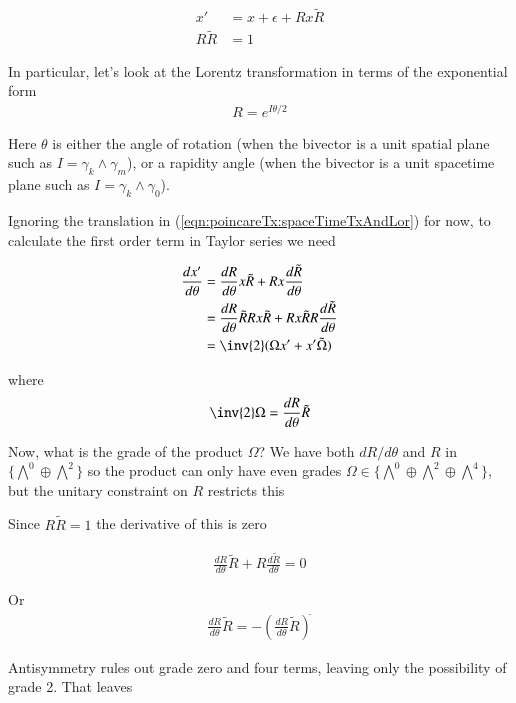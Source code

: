 \begin{align}\label{eqn:poincareTx:spaceTimeTxAndLor}
x' &= x + \epsilon + R x \tilde{R} \\
R \tilde{R} &= 1
\end{align}

In particular, let's look at the Lorentz transformation in terms of the exponential form
\begin{align*}
R = e^{I \theta/2}
\end{align*}

Here $\theta$ is either the angle of rotation (when the bivector is a unit spatial plane such as $I = \gamma_k \wedge \gamma_m$), or a rapidity angle (when the bivector is a unit spacetime plane such as $I = \gamma_k \wedge \gamma_0$).

Ignoring the translation in (\ref{eqn:poincareTx:spaceTimeTxAndLor}) for now, to calculate the first order term in Taylor series we need

\begin{align*}
\frac{dx'}{d\theta} 
&= 
\frac{dR}{d\theta}  x \tilde{R} 
+
{R} x \frac{d\tilde{R}}{d\theta}  
\\
&= 
\frac{dR}{d\theta} \tilde{R} R x \tilde{R} 
+
{R} x \tilde{R} R \frac{d\tilde{R}}{d\theta}  
\\
&=
\inv{2} ( \Omega x' + x' \tilde{\Omega} ) \\
\end{align*}

where 
\begin{align*}
\inv{2}\Omega = \frac{dR}{d\theta} \tilde{R} 
\end{align*}

Now, what is the grade of the product $\Omega$?  We have both $dR/d\theta$ and $R$ in $\{\bigwedge^0 \oplus \bigwedge^2\}$ so the product can only have even grades $\Omega \in \{\bigwedge^0 \oplus \bigwedge^2 \oplus \bigwedge^4\}$, but the unitary constraint on $R$ restricts this

Since $R \tilde{R} = 1$ the derivative of this is zero

\begin{align*}
\frac{dR}{d\theta} \tilde{R} + {R} \frac{d\tilde{R}}{d\theta}  = 0
\end{align*}

Or
\begin{align*}
\frac{dR}{d\theta} \tilde{R} = - \left( \frac{dR}{d\theta} \tilde{R} \right)^{\tilde{}}
\end{align*}

Antisymmetry rules out grade zero and four terms, leaving only the possibility of grade 2.  That leaves

